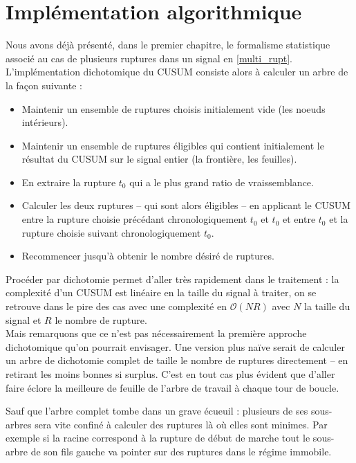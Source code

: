 \documentclass[french,11pt,notitlepage]{report}
\begin{document}
	\section{Implémentation algorithmique}


	Nous avons déjà présenté, dans le premier chapitre, le formalisme statistique associé au cas de plusieurs ruptures dans un signal en \ref{multi_rupt}.
	L'implémentation dichotomique du CUSUM consiste alors à calculer un arbre de la façon suivante :
	\\
	\begin{itemize}
	\item Maintenir un ensemble de ruptures choisis initialement vide (les noeuds intérieurs).
	\item Maintenir un ensemble de ruptures éligibles qui contient initialement le résultat du CUSUM sur le signal entier (la frontière, les feuilles).
	\item En extraire la rupture $t_0$ qui a le plus grand ratio de vraissemblance.
	\item Calculer les deux ruptures -- qui sont alors éligibles -- en applicant le CUSUM entre la rupture choisie précédant chronologiquement $t_0$ et $t_0$ et entre $t_0$ et la rupture choisie suivant chronologiquement $t_0$.
	\item Recommencer jusqu'à obtenir le nombre désiré de ruptures.\\
	\end{itemize}
	
	
	Procéder par dichotomie permet d'aller très rapidement dans le traitement : la complexité d'un CUSUM est linéaire en la taille du signal à traiter, on se retrouve dans le pire des cas avec une complexité en $\mathcal O(NR)$ avec $N$ la taille du signal et $R$ le nombre de rupture.
	\\
	
	Mais remarquons que ce n'est pas nécessairement la première approche dichotomique qu'on pourrait envisager.
	Une version plus naïve serait de calculer un arbre de dichotomie complet de taille le nombre de ruptures directement -- en retirant les moins bonnes si surplus.
	C'est en tout cas plus évident que d'aller faire éclore la meilleure de feuille de l'arbre de travail à chaque tour de boucle.
	
	Sauf que l'arbre complet tombe dans un grave écueuil : plusieurs de ses sous-arbres sera vite confiné à calculer des ruptures là où elles sont minimes.
	Par exemple si la racine correspond à la rupture de début de marche tout le sous-arbre de son fils gauche va pointer sur des ruptures dans le régime immobile.
	\\
	
\end{document}
